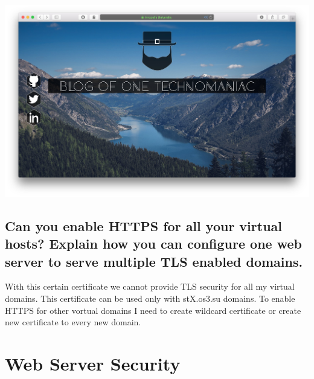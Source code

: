 \documentclass[a4paper,11pt]{article}
\begin{document}
\begin{center}
\includegraphics[width=17cm]{browser}
\end{center}


\subsection{Can you enable HTTPS for all your virtual hosts? Explain how you can configure one web server to serve multiple TLS enabled domains.}
With this certain certificate we cannot provide TLS security for all my virtual domains. This certificate can be used only with stX.os3.su domains. To enable HTTPS for other vortual domains I need to create wildcard certificate or create new certificate to every new domain.

\section{Web Server Security}
\addtocounter{subsection}{10}
\end{document}
